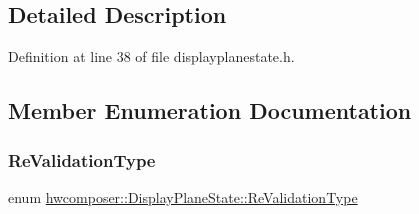 \subsection{Detailed Description}


Definition at line 38 of file displayplanestate.\+h.



\subsection{Member Enumeration Documentation}
\mbox{\label{classhwcomposer_1_1DisplayPlaneState_ad2e0ccaa6d76d538d9338563c91db589}} 
\subsubsection{\texorpdfstring{Re\+Validation\+Type}{ReValidationType}}
{\footnotesize\ttfamily enum \mbox{\hyperlink{classhwcomposer_1_1DisplayPlaneState_ad2e0ccaa6d76d538d9338563c91db589}{hwcomposer\+::\+Display\+Plane\+State\+::\+Re\+Validation\+Type}}}

